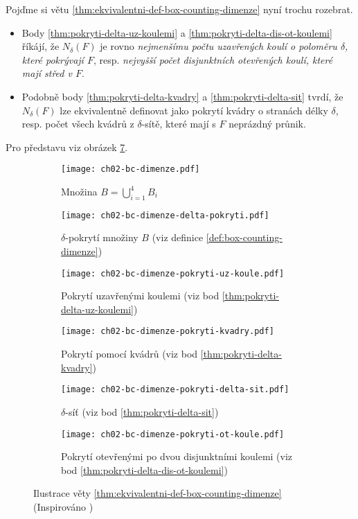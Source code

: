 Pojďme si větu \ref{thm:ekvivalentni-def-box-counting-dimenze} nyní trochu rozebrat.
\begin{itemize}
    \item Body \ref{thm:pokryti-delta-uz-koulemi} a \ref{thm:pokryti-delta-dis-ot-koulemi} říkájí, že $N_\delta(F)$ je rovno \emph{nejmenšímu počtu uzavřených koulí o poloměru $\delta$, které pokrývají $F$}, resp. \emph{nejvyšší počet disjunktních otevřených koulí, které mají střed v $F$}.
    \item Podobně body \ref{thm:pokryti-delta-kvadry} a \ref{thm:pokryti-delta-sit} tvrdí, že $N_\delta(F)$ lze ekvivalentně definovat jako pokrytí kvádry o stranách délky $\delta$, resp. počet všech kvádrů z $\delta$-sítě, které mají s $F$ neprázdný průnik.
\end{itemize}
Pro představu viz obrázek \ref{fig:ilustrace-definic-bc-dimenze}.
\begin{figure}[h]
    \centering
    \begin{subfigure}{0.4\textwidth}
        \centering
        \texttt{[image: ch02-bc-dimenze.pdf]}
        \caption{Množina $B=\bigcup_{i=1}^4 B_i$}
        \label{subfig:bc-dimenze-pokryvana-mnozina}
    \end{subfigure}
    \qquad
    \begin{subfigure}{0.4\textwidth}
        \centering
        \texttt{[image: ch02-bc-dimenze-delta-pokryti.pdf]}
        \caption{$\delta$-pokrytí množiny $B$ (viz definice \ref{def:box-counting-dimenze})}
        \label{subfig:bc-dimenze-delta-pokryti}
    \end{subfigure}
    \qquad
    \begin{subfigure}{0.4\textwidth}
        \centering
        \texttt{[image: ch02-bc-dimenze-pokryti-uz-koule.pdf]}
        \caption{Pokrytí uzavřenými koulemi (viz bod \ref{thm:pokryti-delta-uz-koulemi})}
        \label{subfig:bc-dimenze-uz-koule}
    \end{subfigure}
    \qquad
    \begin{subfigure}{0.4\textwidth}
        \centering
        \texttt{[image: ch02-bc-dimenze-pokryti-kvadry.pdf]}
        \caption{Pokrytí pomocí kvádrů (viz bod \ref{thm:pokryti-delta-kvadry})}
        \label{subfig:bc-dimenze-kvadry}
    \end{subfigure}
    \qquad
    \begin{subfigure}{0.4\textwidth}
        \centering
        \texttt{[image: ch02-bc-dimenze-pokryti-delta-sit.pdf]}
        \caption{$\delta$-síť (viz bod \ref{thm:pokryti-delta-sit})}
        \label{subfig:bc-dimenze-delta-sit}
    \end{subfigure}
    \qquad
    \begin{subfigure}{0.4\textwidth}
        \centering
        \texttt{[image: ch02-bc-dimenze-pokryti-ot-koule.pdf]}
        \caption{Pokrytí otevřenými po dvou disjunktními koulemi (viz bod \ref{thm:pokryti-delta-dis-ot-koulemi})}
        \label{subfig:bc-dimenze-ot-koule}
    \end{subfigure}
    \caption{Ilustrace věty \ref{thm:ekvivalentni-def-box-counting-dimenze} (Inspirováno \citep[str. 29]{Falconer2014})}
    \label{fig:ilustrace-definic-bc-dimenze}
\end{figure}

